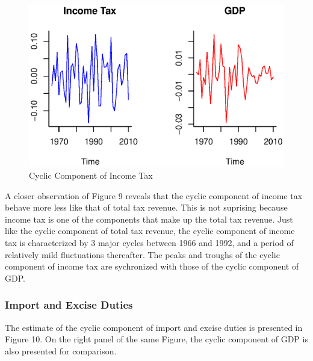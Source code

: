 \documentclass[12pt,a4paper,final]{article}
\begin{document}
\begin{figure}[ht]
\centering
\begin{small}
\caption{Cyclic Component of Income Tax}
\end{small}
\includegraphics[scale=0.601]{income_tax.eps} 
\end{figure}

A closer observation of Figure 9 reveals that the cyclic component of income tax behave more less like that of total tax revenue.  This is not suprising because income tax is one of the components that make up the total tax revenue. Just like the cyclic component of total tax revenue, the cyclic component of income tax is characterized by 3 major cycles between 1966 and 1992, and a period of relatively mild fluctuations thereafter. The peaks and troughs of the cyclic component of income tax are sychronized with those of the cyclic component of GDP.

\subsubsection{Import and Excise Duties}

The estimate of the cyclic component of import and excise duties is presented in Figure 10. On the right panel of the same Figure, the cyclic component of GDP is also presented for comparison.
\end{document}
